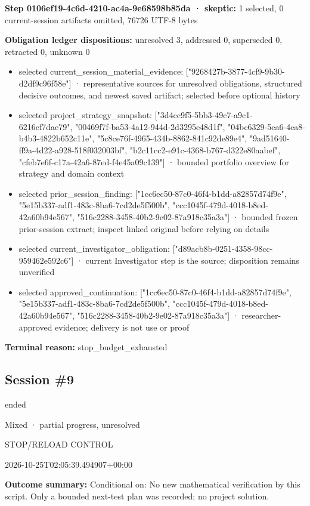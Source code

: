 \documentclass[11pt]{article}
\begin{document}
\textbf{Step 0106ef19-4c6d-4210-ac4a-9e68598b85da · skeptic:} 1 selected, 0 current-session artifacts omitted, 76726 UTF-8 bytes\par
\textbf{Obligation ledger dispositions:} unresolved 3, addressed 0, superseded 0, retracted 0, unknown 0\par
\begin{itemize}
\item selected current\_session\_material\_evidence: ["9268427b-3877-4cf9-9b30-d2df9c96f58e"] · representative sources for unresolved obligations, structured decisive outcomes, and newest saved artifact; selected before optional history
\item selected project\_strategy\_snapshot: ["3d4cc9f5-5bb3-49c7-a9c1-6216ef7dae79", "00469f7f-ba53-4a12-944d-2d3295e48d1f", "04bc6329-5ea6-4ea8-b4b3-4822b652c11e", "5c8ce76f-4965-434b-8862-841c92de89e4", "9ad51640-ff9a-4d22-a928-518f032003bf", "b2c11cc2-e91c-4368-b767-d322e80aabef", "cfeb7e6f-c17a-42a6-87ed-f4e45a09c139"] · bounded portfolio overview for strategy and domain context
\item selected prior\_session\_finding: ["1cc6ec50-87c0-46f4-b1dd-a82857d74f9e", "5e15b337-adf1-483c-8ba6-7cd2de5f500b", "ccc1045f-479d-4018-b8ed-42a60b94e567", "516c2288-3458-40b2-9e02-87a918c35a3a"] · bounded frozen prior-session extract; inspect linked original before relying on details
\item selected current\_investigator\_obligation: ["d89acb8b-0251-4358-98cc-959462e592c6"] · current Investigator step is the source; disposition remains unverified
\item selected approved\_continuation: ["1cc6ec50-87c0-46f4-b1dd-a82857d74f9e", "5e15b337-adf1-483c-8ba6-7cd2de5f500b", "ccc1045f-479d-4018-b8ed-42a60b94e567", "516c2288-3458-40b2-9e02-87a918c35a3a"] · researcher-approved evidence; delivery is not use or proof
\end{itemize}
\textbf{Terminal reason:} stop\_budget\_exhausted\par
\subsection{Session \#9}
\begin{description}[style=nextline,font=\normalfont\bfseries,leftmargin=0pt,labelsep=0pt]
\item[Execution status] ended
\item[Outcome] Mixed · partial progress, unresolved
\item[Strategy] STOP/RELOAD CONTROL
\item[Started] 2026-10-25T02:05:39.494907+00:00
\end{description}
\textbf{Outcome summary:} Conditional on: No new mathematical verification by this script. Only a bounded next-test plan was recorded; no project solution.\par
\end{document}
